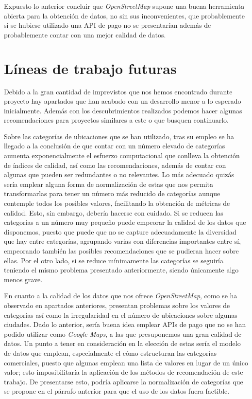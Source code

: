 Expuesto lo anterior concluir que \textit{OpenStreetMap} supone una buena herramienta abierta para la obtención de datos, no sin sus inconvenientes, que probablemente si se hubiese utilizado una API de pago no se presentarían además de probablemente contar con una mejor calidad de datos.



\section{Líneas de trabajo futuras}

Debido a la gran cantidad de imprevistos que nos hemos encontrado durante proyecto hay apartados que han acabado con un desarrollo menor a lo esperado inicialmente. Además con los descubrimientos realizados podemos hacer algunas recomendaciones para proyectos similares a este o que busquen continuarlo.

Sobre las categorías de ubicaciones que se han utilizado, tras su empleo se ha llegado a la conclusión de que contar con un número elevado de categorías aumenta exponencialmente el esfuerzo computacional que conlleva la obtención de índices de calidad, así como las recomendaciones, además de contar con algunas que pueden ser redundantes o no relevantes. Lo más adecuado quizás sería emplear alguna forma de normalización de estas que nos permita transformarlas para tener un número más reducido de categorías aunque contemple todos los posibles valores, facilitando la obtención de métricas de calidad. Esto, sin embargo, debería hacerse con cuidado. Si se reducen las categorías a un número muy pequeño puede empeorar la calidad de los datos que disponemos, puesto que puede que no se capture adecuadamente la diversidad que hay entre categorías, agrupando varias con diferencias importantes entre sí, empeorando también las posibles recomendaciones que se pudieran hacer sobre ellas. Por el otro lado, si se reduce mínimamente las categorías se seguiría teniendo el mismo problema presentado anteriormente, siendo únicamente algo menos grave.

En cuanto a la calidad de los datos que nos ofrece \textit{OpenStreetMap}, como se ha observado en apartados anteriores, presentan problemas sobre los valores de categorías así como la irregularidad en el número de ubicaciones sobre algunas ciudades. Dado lo anterior, sería buena idea emplear APIs de pago que no se han podido utilizar como \textit{Google Maps}, a las que presuponemos una gran calidad de datos. Un punto a tener en consideración en la elección de estas sería el modelo de datos que emplean, especialmente el cómo estructuran las categorías comerciales, puesto que algunas emplean una lista de valores en lugar de un único valor; esto imposibilitaría la aplicación de los métodos de recomendación de este trabajo. De presentarse esto, podría aplicarse la normalización de categorías que se propone en el párrafo anterior para que el uso de los datos fuera factible.

